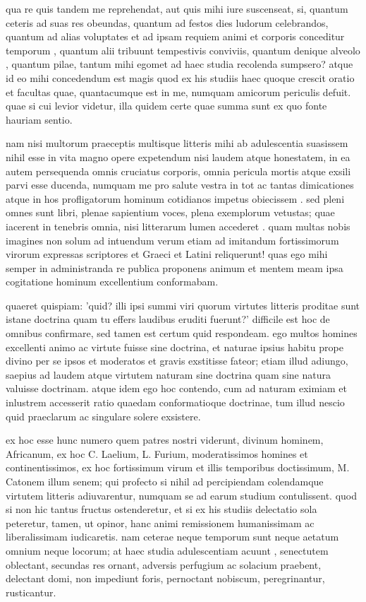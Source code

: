  qua re quis tandem me reprehendat, aut quis mihi iure suscenseat, si, quantum ceteris ad suas res obeundas, quantum ad festos dies ludorum celebrandos, quantum ad alias voluptates et ad ipsam requiem animi et corporis conceditur temporum , quantum alii tribuunt tempestivis conviviis, quantum denique alveolo , quantum pilae, tantum mihi egomet ad haec studia recolenda sumpsero? atque id eo mihi concedendum est magis quod ex his studiis haec quoque crescit oratio et facultas quae, quantacumque est in me, numquam amicorum periculis defuit. quae si cui levior videtur, illa quidem certe quae summa sunt ex quo fonte hauriam sentio.

 nam nisi multorum praeceptis multisque litteris mihi ab adulescentia suasissem nihil esse in vita magno opere expetendum nisi laudem atque honestatem, in ea autem persequenda omnis cruciatus corporis, omnia pericula mortis atque exsili parvi esse ducenda, numquam me pro salute vestra in tot ac tantas dimicationes atque in hos profligatorum hominum cotidianos impetus obiecissem . sed pleni omnes sunt libri, plenae sapientium voces, plena exemplorum vetustas; quae iacerent in tenebris omnia, nisi litterarum lumen accederet . quam multas nobis imagines non solum ad intuendum verum etiam ad imitandum fortissimorum virorum expressas scriptores et Graeci et Latini reliquerunt! quas ego mihi semper in administranda re publica proponens animum et mentem meam ipsa cogitatione hominum excellentium conformabam.

 quaeret quispiam: 'quid? illi ipsi summi viri quorum virtutes litteris proditae sunt istane doctrina quam tu effers laudibus eruditi fuerunt?' difficile est hoc de omnibus confirmare, sed tamen est certum quid respondeam. ego multos homines excellenti animo ac virtute fuisse sine doctrina, et naturae ipsius habitu prope divino per se ipsos et moderatos et gravis exstitisse fateor; etiam illud adiungo, saepius ad laudem atque virtutem naturam sine doctrina quam sine natura valuisse doctrinam. atque idem ego hoc contendo, cum ad naturam eximiam et inlustrem accesserit ratio quaedam conformatioque doctrinae, tum illud nescio quid praeclarum ac singulare solere exsistere.

 ex hoc esse hunc numero quem patres nostri viderunt, divinum hominem, Africanum, ex hoc C. Laelium, L. Furium, moderatissimos homines et continentissimos, ex hoc fortissimum virum et illis temporibus doctissimum, M. Catonem illum senem; qui profecto si nihil ad percipiendam colendamque virtutem litteris adiuvarentur, numquam se ad earum studium contulissent. quod si non hic tantus fructus ostenderetur, et si ex his studiis delectatio sola peteretur, tamen, ut opinor, hanc animi remissionem humanissimam ac liberalissimam iudicaretis. nam ceterae neque temporum sunt neque aetatum omnium neque locorum; at haec studia adulescentiam acuunt , senectutem oblectant, secundas res ornant, adversis perfugium ac solacium praebent, delectant domi, non impediunt foris, pernoctant nobiscum, peregrinantur, rusticantur.

